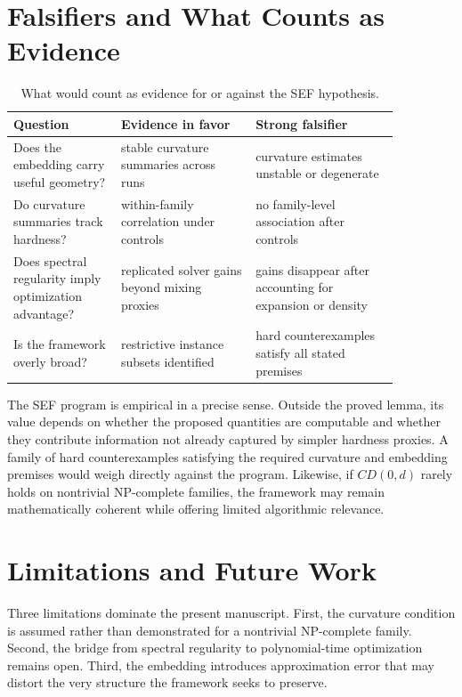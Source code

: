\documentclass{svjour3}
\begin{document}
\section{Falsifiers and What Counts as Evidence}
\begin{table}[t]
\centering
\small
\caption{What would count as evidence for or against the SEF hypothesis.}
\label{tab:sef-evidence}
\begin{tabular}{p{0.24\linewidth}p{0.30\linewidth}p{0.32\linewidth}}
\toprule
Question & Evidence in favor & Strong falsifier \\
\midrule
Does the embedding carry useful geometry? & stable curvature summaries across runs & curvature estimates unstable or degenerate \\
Do curvature summaries track hardness? & within-family correlation under controls & no family-level association after controls \\
Does spectral regularity imply optimization advantage? & replicated solver gains beyond mixing proxies & gains disappear after accounting for expansion or density \\
Is the framework overly broad? & restrictive instance subsets identified & hard counterexamples satisfy all stated premises \\
\bottomrule
\end{tabular}
\end{table}

The SEF program is empirical in a precise sense. Outside the proved lemma, its value depends on whether the proposed quantities are computable and whether they contribute information not already captured by simpler hardness proxies. A family of hard counterexamples satisfying the required curvature and embedding premises would weigh directly against the program. Likewise, if $CD(0,d)$ rarely holds on nontrivial NP-complete families, the framework may remain mathematically coherent while offering limited algorithmic relevance.

\section{Limitations and Future Work}
Three limitations dominate the present manuscript. First, the curvature condition is assumed rather than demonstrated for a nontrivial NP-complete family. Second, the bridge from spectral regularity to polynomial-time optimization remains open. Third, the embedding introduces approximation error that may distort the very structure the framework seeks to preserve.
\end{document}

